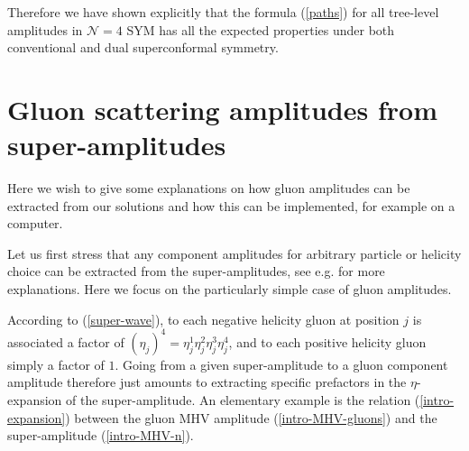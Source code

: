 \documentclass[12pt]{article}
\begin{document}
{Therefore we have shown explicitly that the formula (\ref{paths}) for all
tree-level amplitudes in $\mathcal{N}=4$ SYM has all the expected
properties under both conventional and dual superconformal symmetry.




\section{Gluon scattering amplitudes from super-amplitudes}\label{sect-app-components}
Here we wish to give some explanations on how gluon amplitudes can be extracted from
our solutions and how this can be implemented, for example on a computer.

Let us first stress that any component amplitudes for arbitrary particle or helicity choice
can be extracted from the super-amplitudes, see e.g. \cite{dhks5} for more explanations. Here we focus on the
particularly simple case of gluon amplitudes.

According to (\ref{super-wave}), to each negative helicity gluon at position $j$ is associated a factor of $(\eta_{j})^4 = \eta_{j}^{1} \eta_{j}^{2} \eta_{j}^{3} \eta_{j}^{4}$, and to each positive helicity gluon simply a factor of $1$. Going from a given super-amplitude to a gluon component amplitude therefore just amounts to extracting
specific prefactors in the $\eta$-expansion of the super-amplitude.
An elementary example is the relation (\ref{intro-expansion}) between the gluon MHV amplitude (\ref{intro-MHV-gluons})
and the super-amplitude (\ref{intro-MHV-n}).

}
\end{document}
